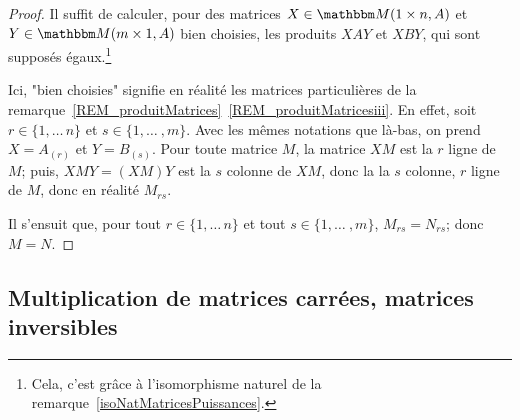 \begin{proof}
    Il suffit de calculer, pour des matrices \( X \in \eM(1 \times n,A) \) et \( Y \in \eM(m \times 1,A) \) bien choisies, les produits \( XAY \) et \( XBY \), qui sont supposés égaux.\footnote{Cela, c'est grâce à l'isomorphisme naturel de la remarque~\ref{isoNatMatricesPuissances}.}
    
    Ici, "bien choisies" signifie en réalité les matrices particulières de la remarque~\ref{REM_produitMatrices}~\ref{REM_produitMatricesiii}. En effet, soit \( r \in \{1,\dots\, n\} \) et \(s \in \{1,\dots\ , m\} \). Avec les mêmes notations que là-bas, on prend \( X = A_{(r)} \) et \( Y = B_{(s)} \). Pour toute matrice \( M \), la matrice \( XM \) est la \(r\)\ieme{} ligne de \( M \); puis, \( XMY = (XM) Y \) est la \(s\)\ieme{} colonne de \( XM \), donc la la \(s\)\ieme{} colonne,  \(r\)\ieme{} ligne de \( M \), donc en réalité \( M_{rs} \).
    
    Il s'ensuit que, pour tout \( r \in \{1,\dots\, n\} \) et tout \(s \in \{1,\dots\ , m\} \), \( M_{rs} = N_{rs} \); donc  \( M = N \).
\end{proof}

\subsection{Multiplication de matrices carrées, matrices inversibles}


